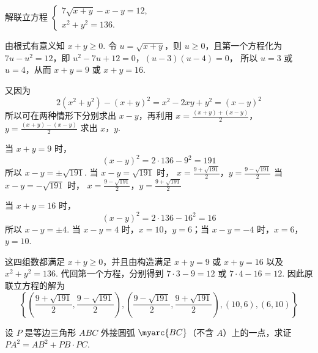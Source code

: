 \begin{problem}
解联立方程 \(\begin{cases}
7\sqrt{x+y}-x-y=12,\\
x^{2}+y^{2}=136.
\end{cases}\)
\end{problem}

\begin{solution}
由根式有意义知 \(x+y\geq0\). 令 \(u=\sqrt{x+y}\)，则 \(u\geq0\)，且第一个方程化为 \(7u-u^{2}=12\)，即
\(u^{2}-7u+12=0\)，\(\left(u-3\right)\left(u-4\right)=0\)，
所以 \(u=3\) 或 \(u=4\)，从而 \(x+y=9\) 或 \(x+y=16\).

又因为
\[
2\left(x^{2}+y^{2}\right)-\left(x+y\right)^{2}=x^{2}-2xy+y^{2}=\left(x-y\right)^{2}
\]
所以可在两种情形下分别求出 \(x-y\)，再利用 \(x=\frac{(x+y)+(x-y)}{2}\)，\(y=\frac{(x+y)-(x-y)}{2}\) 求出 \(x\)，\(y\).

当 \(x+y=9\) 时，
\[
\left(x-y\right)^{2}=2\cdot136-9^{2}=191
\]
所以 \(x-y=\pm\sqrt{191}\). 当 \(x-y=\sqrt{191}\) 时，
\(x=\frac{9+\sqrt{191}}{2}\)，\(y=\frac{9-\sqrt{191}}{2}\)
当 \(x-y=-\sqrt{191}\) 时，
\(x=\frac{9-\sqrt{191}}{2}\)，\(y=\frac{9+\sqrt{191}}{2}\)

当 \(x+y=16\) 时，
\[
\left(x-y\right)^{2}=2\cdot136-16^{2}=16
\]
所以 \(x-y=\pm4\). 当 \(x-y=4\) 时，\(x=10\)，\(y=6\)；当 \(x-y=-4\) 时，\(x=6\)，\(y=10\).

这四组数都满足 \(x+y\geq0\)，并且由构造满足 \(x+y=9\) 或 \(x+y=16\) 以及 \(x^{2}+y^{2}=136\). 代回第一个方程，分别得到 \(7\cdot3-9=12\) 或 \(7\cdot4-16=12\). 因此原联立方程的解为
\[
\left\{
\left(\frac{9+\sqrt{191}}{2},\frac{9-\sqrt{191}}{2}\right),
\left(\frac{9-\sqrt{191}}{2},\frac{9+\sqrt{191}}{2}\right),
(10,6),(6,10)
\right\}
\]
\end{solution}

\begin{problem}
设 \(P\) 是等边三角形 \(ABC\) 外接圆弧 \(\myarc{BC}\)（不含 \(A\)）上的一点，求证 \(PA^{2}=AB^{2}+PB\cdot PC\).
\end{problem}

